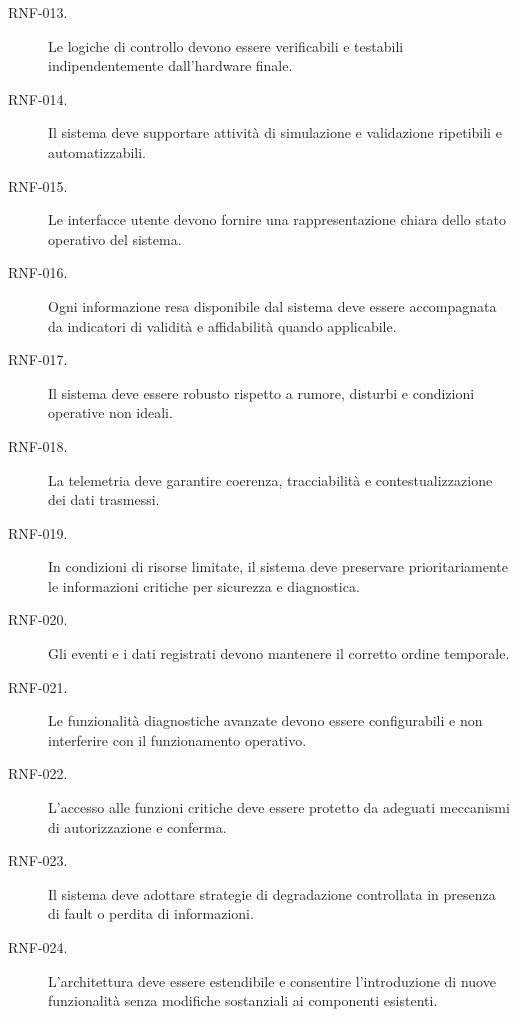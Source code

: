 \documentclass{article}
\begin{document}
\begin{description}
    \item[RNF-013.] Le logiche di controllo devono essere verificabili e
          testabili indipendentemente dall'hardware finale.

    \item[RNF-014.] Il sistema deve supportare attività di simulazione e
          validazione ripetibili e automatizzabili.

    \item[RNF-015.] Le interfacce utente devono fornire una rappresentazione
          chiara dello stato operativo del sistema.

    \item[RNF-016.] Ogni informazione resa disponibile dal sistema deve essere
          accompagnata da indicatori di validità e affidabilità quando
          applicabile.

    \item[RNF-017.] Il sistema deve essere robusto rispetto a rumore, disturbi e
          condizioni operative non ideali.

    \item[RNF-018.] La telemetria deve garantire coerenza, tracciabilità e
          contestualizzazione dei dati trasmessi.

    \item[RNF-019.] In condizioni di risorse limitate, il sistema deve
          preservare prioritariamente le informazioni critiche per sicurezza e
          diagnostica.

    \item[RNF-020.] Gli eventi e i dati registrati devono mantenere il corretto
          ordine temporale.

    \item[RNF-021.] Le funzionalità diagnostiche avanzate devono essere
          configurabili e non interferire con il funzionamento operativo.

    \item[RNF-022.] L'accesso alle funzioni critiche deve essere protetto da
          adeguati meccanismi di autorizzazione e conferma.

    \item[RNF-023.] Il sistema deve adottare strategie di degradazione
          controllata in presenza di fault o perdita di informazioni.

    \item[RNF-024.] L'architettura deve essere estendibile e consentire
          l'introduzione di nuove funzionalità senza modifiche sostanziali ai
          componenti esistenti.
\end{description}
\end{document}
